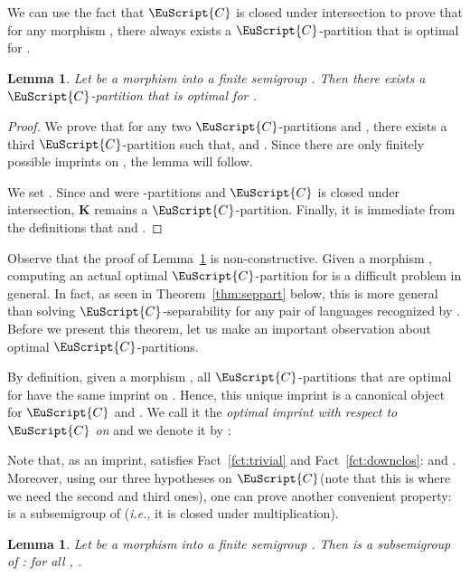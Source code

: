 \documentclass{CSML}
\newcommand\Cs{\ensuremath{\EuScript{C}}\xspace}
\newcommand\Kb{\ensuremath{\mathbf{K}}\xspace}
\theoremstyle{plain}
\newtheorem{lemma}[thm]{Lemma}
\begin{document}
We can use the fact that \Cs is closed under intersection to prove
that for any morphism , there always exists a \Cs-partition that is
optimal for .

\begin{lemma} \label{lem:optimal}
  Let  be a morphism into a finite semigroup
  . Then there exists a \Cs-partition that is optimal for .
\end{lemma}

\begin{proof}
  We prove that for any two \Cs-partitions  and , there
  exists a third \Cs-partition  such that,  and . Since there are only finitely possible imprints
  on , the lemma will follow.

  We set . Since  and  were -partitions and \Cs is
  closed under intersection, \Kb remains a \Cs-partition. Finally, it is
  immediate from the definitions that   and .
\end{proof}

Observe that the proof of Lemma~\ref{lem:optimal} is non-constructive.
Given a morphism , computing an actual optimal \Cs-partition
for  is a difficult problem in general. In fact, as seen in
Theorem~\ref{thm:seppart} below, this is more general than solving
\Cs-separability for any pair of languages recognized by .
Before we present this theorem, let us make an important observation
about optimal \Cs-partitions.

By definition, given a morphism , all \Cs-partitions that are
optimal for  have the same imprint on . Hence, this
unique imprint is a canonical object for \Cs and . We call it
the \emph{optimal imprint with respect to\/ \Cs on\/ } and we
denote it by :

Note that, as an imprint,  satisfies
Fact~\ref{fct:trivial} and Fact~\ref{fct:downclos}:  and . Moreover, using our three hypotheses on \Cs (note
that this is where we need the second and third ones), one can prove
another convenient property:  is a subsemigroup of
 (\emph{i.e.}, it is closed under multiplication).

\begin{lemma} \label{lem:usemi}
  Let  be a morphism into a finite semigroup
  . Then  is a subsemigroup of : for all , .
\end{lemma}
\end{document}
